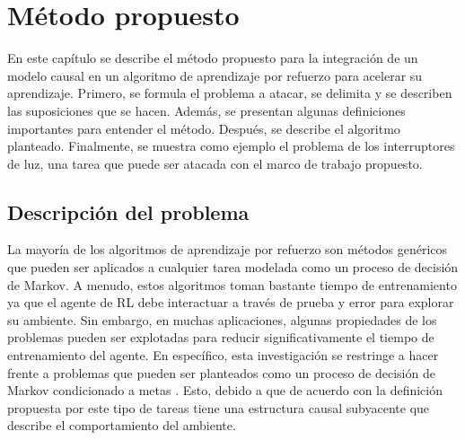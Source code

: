 \chapter{Método propuesto}\label{chapter4}

\graphicspath{{Chapter4/Figs/}}

En este capítulo se describe el método propuesto para la integración
de un modelo causal en un algoritmo de aprendizaje por refuerzo para
acelerar su aprendizaje. Primero, se formula el problema a atacar, se delimita
y se describen las suposiciones que se hacen. Además, se presentan algunas definiciones 
importantes para entender el método.
Después, se describe el algoritmo planteado. Finalmente, se muestra como 
ejemplo el problema de los interruptores de luz, una tarea que puede ser atacada
con el marco de trabajo propuesto.

    
\section{Descripción del problema}

La mayoría de los algoritmos de aprendizaje por refuerzo son métodos genéricos que pueden ser aplicados a cualquier tarea modelada como un proceso de decisión de Markov.
A menudo, estos algoritmos toman bastante tiempo de entrenamiento ya que el agente de RL debe
interactuar a través de prueba y error para explorar su ambiente. 
Sin embargo, en muchas aplicaciones, algunas
propiedades de los problemas pueden ser explotadas para reducir significativamente el tiempo
de entrenamiento del agente. En específico, esta investigación se restringe a hacer frente
a problemas que pueden ser planteados como un proceso de decisión de Markov condicionado a metas
\cite{nair2019causal}. Esto, debido a que de acuerdo  con la definición propuesta por \cite{nair2019causal} este 
tipo de tareas tiene una estructura causal subyacente que describe el comportamiento del ambiente.

